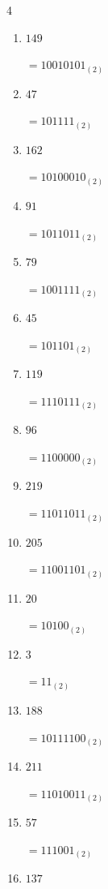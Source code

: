 \begin{multicols}{4}
\begin{enumerate}
        $=111010_{(2)}$

  \item $149$

        $=10010101_{(2)}$

  \item $47$

        $=101111_{(2)}$

  \item $162$

        $=10100010_{(2)}$

  \item $91$

        $=1011011_{(2)}$

  \item $79$

        $=1001111_{(2)}$

  \item $45$

        $=101101_{(2)}$

  \item $119$

        $=1110111_{(2)}$

  \item $96$

        $=1100000_{(2)}$

  \item $219$

        $=11011011_{(2)}$

  \item $205$

        $=11001101_{(2)}$

  \item $20$

        $=10100_{(2)}$

  \item $3$

        $=11_{(2)}$

\columnbreak %

  \item $188$

        $=10111100_{(2)}$

  \item $211$

        $=11010011_{(2)}$

  \item $57$

        $=111001_{(2)}$

  \item $137$


\end{enumerate}
\end{multicols}
